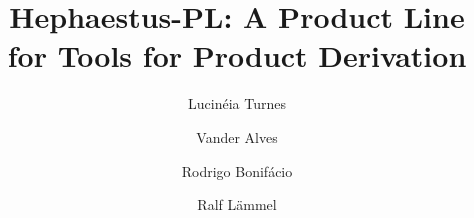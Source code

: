 \documentclass[preprint,12pt]{elsarticle}
\newcommand{\hpl}{\textsf{Hephaestus-PL}}
\begin{document}
\begin{frontmatter}



\title{\hpl: A Product Line for Tools for Product Derivation}


\author[unb]{Lucin\'{e}ia Turnes}
\author[unb]{Vander Alves}
\author[unb]{Rodrigo Bonif\'{a}cio}
\author[ukob]{Ralf L\"{a}mmel}

\address[unb]{Departamento de Ci\^{e}ncia da Computa\c{c}\~{a}o, Universidade de Bras\'{i}lia, Campus Darcy Ribeiro, Bras\'{i}lia, Brazil, 70910-900}
\address[ukob]{Software Languages Team, Universit\"{a}t Koblenz-Landau, Institut f\"{u}r Informatik, Universittsstra\ss{}e 1, D-56070 Koblenz, Germany}

\author{}

\address{}

\begin{abstract}


\end{abstract}
\end{frontmatter}
\end{document}
